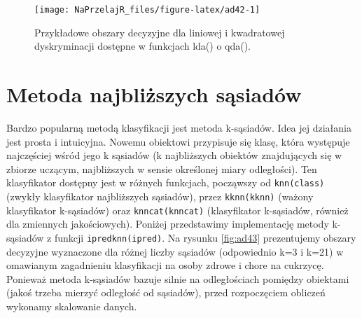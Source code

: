\documentclass[polish,]{book}
\newenvironment{Shaded}{\begin{snugshade}}{\end{snugshade}}
\newcommand{\DataTypeTok}[1]{\textcolor[rgb]{0.13,0.29,0.53}{#1}}
\newcommand{\DecValTok}[1]{\textcolor[rgb]{0.00,0.00,0.81}{#1}}
\newcommand{\KeywordTok}[1]{\textcolor[rgb]{0.13,0.29,0.53}{\textbf{#1}}}
\newcommand{\NormalTok}[1]{#1}
\newcommand{\OperatorTok}[1]{\textcolor[rgb]{0.81,0.36,0.00}{\textbf{#1}}}
\newcommand{\StringTok}[1]{\textcolor[rgb]{0.31,0.60,0.02}{#1}}
\begin{document}
\begin{Shaded}
\end{Shaded}

\begin{figure}[h]

{\centering \texttt{[image: NaPrzelajR\_files/figure-latex/ad42-1]} 

}

\caption{Przykładowe obszary decyzyjne dla liniowej i kwadratowej dyskryminacji dostępne w funkcjach lda() o qda().}\label{fig:ad42}
\end{figure}

\hypertarget{part_42}{%
\section{Metoda najbliższych sąsiadów}\label{part_42}}

Bardzo popularną metodą klasyfikacji jest metoda k-sąsiadów. Idea jej działania
jest prosta i intuicyjna. Nowemu obiektowi przypisuje się klasę, która występuje
najczęściej wśród jego k sąsiadów (k najbliższych obiektów znajdujących się w zbiorze uczącym, najbliższych w sensie określonej miary odległości). Ten klasyfikator
dostępny jest w różnych funkcjach, począwszy od \texttt{knn(class)} (zwykły klasyfikator najbliższych sąsiadów), przez \texttt{kknn(kknn)} (ważony klasyfikator k-sąsiadów) oraz
\texttt{knncat(knncat)} (klasyfikator k-sąsiadów, również dla zmiennych jakościowych).
Poniżej przedstawimy implementację metody k-sąsiadów z funkcji \texttt{ipredknn(ipred)}.
Na rysunku \ref{fig:ad43} prezentujemy obszary decyzyjne wyznaczone dla różnej liczby sąsiadów (odpowiednio k=3 i k=21) w omawianym zagadnieniu klasyfikacji na osoby
zdrowe i chore na cukrzycę. Ponieważ metoda k-sąsiadów bazuje silnie na odległościach pomiędzy obiektami (jakoś trzeba mierzyć odległość od sąsiadów), przed rozpoczęciem obliczeń wykonamy skalowanie danych.
\end{document}
